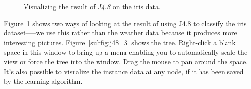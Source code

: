 \begin{figure}[!th]
\centering
{}
\newline
{}
\caption{\label{fig:j48_iris}Visualizing the result of \textit{J4.8} on the iris data.}
\end{figure}

Figure~\ref{fig:j48_iris} shows two ways of looking at the result of
using J4.8 to classify the iris dataset--—we use this rather than the
weather data because it produces more interesting
pictures. Figure~\ref{subfig:j48_3} shows the tree. Right-click a
blank space in this window to bring up a menu enabling you to
automatically scale the view or force the tree into the window. Drag
the mouse to pan around the space. It’s also possible to visualize the
instance data at any node, if it has been saved by the learning
algorithm.

